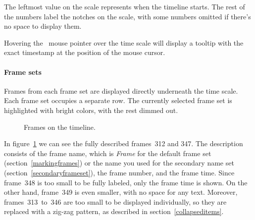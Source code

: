 \documentclass[hidelinks,titlepage,a4paper]{article}
\begin{document}
The leftmost value on the scale represents when the timeline starts. The rest of the numbers label the notches on the scale, with some numbers omitted if there's no space to display them.

Hovering the \faMousePointer{}~mouse pointer over the time scale will display a tooltip with the exact timestamp at the position of the mouse cursor.

\paragraph{Frame sets}
\label{framesets}

Frames from each frame set are displayed directly underneath the time scale. Each frame set occupies a separate row. The currently selected frame set is highlighted with bright colors, with the rest dimmed out.

\begin{figure}[h]
\centering{}
\caption{Frames on the timeline.}
\label{framesetsfig}
\end{figure}

In figure~\ref{framesetsfig} we can see the fully described frames~312 and 347. The description consists of the frame name, which is \emph{Frame} for the default frame set (section~\ref{markingframes}) or the name you used for the secondary name set (section~\ref{secondaryframeset}), the frame number, and the frame time. Since frame~348 is too small to be fully labeled, only the frame time is shown. On the other hand, frame~349 is even smaller, with no space for any text. Moreover, frames~313~to~346 are too small to be displayed individually, so they are replaced with a zig-zag pattern, as described in section~\ref{collapseditems}.
\end{document}
